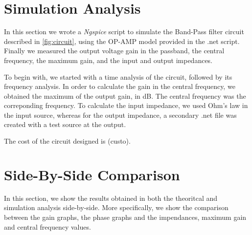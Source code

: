 \section{Simulation Analysis}
\label{sec:simulation}

In this section we wrote a \textit{Ngspice} script to simulate the Band-Pass 
filter circuit described in \ref{fig:circuit}, using the OP-AMP model provided in the .net script.
Finally we measured the output voltage gain in the passband, the central frequency, the maximum gain, and the input and output impedances.

To begin with, we started with a time analysis of the circuit, followed by its frequency analysis. In order to calculate the gain in the central frequency, we obtained the maximum of the output gain, in dB. 
The central frequency was the correponding frequency. To calculate the input impedance, we used Ohm's law in the input source, whereas for the output impedance, a secondary .net file was created with a test source at the output. 

The cost of the circuit designed is (custo).


\section{Side-By-Side Comparison}
\label{sec:side}

In this section, we show the results obtained in both the theoritcal and simulation analysis side-by-side. More specifically, we show the comparison between the gain graphs, the phase graphs and the impendances, maximum gain and central frequency values.

